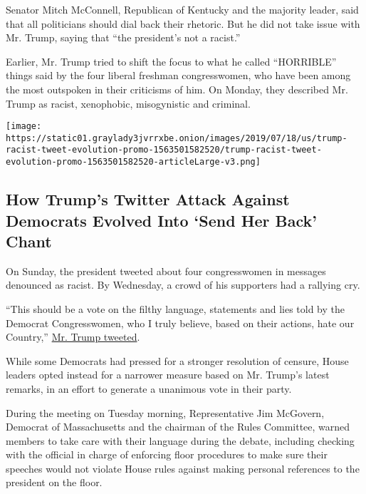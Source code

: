 Senator Mitch McConnell, Republican of Kentucky and the majority leader,
said that all politicians should dial back their rhetoric. But he did
not take issue with Mr. Trump, saying that ``the president's not a
racist.''

Earlier, Mr. Trump tried to shift the focus to what he called
``HORRIBLE'' things said by the four liberal freshman congresswomen, who
have been among the most outspoken in their criticisms of him. On
Monday, they described Mr. Trump as racist, xenophobic, misogynistic and
criminal.

\href{https://www.nytimes3xbfgragh.onion/interactive/2019/07/18/us/politics/trump-racist-tweet-evolution.html}{}

\texttt{[image: https://static01.graylady3jvrrxbe.onion/images/2019/07/18/us/trump-racist-tweet-evolution-promo-1563501582520/trump-racist-tweet-evolution-promo-1563501582520-articleLarge-v3.png]}

\hypertarget{how-trumps-twitter-attack-against-democrats-evolved-into-send-her-back-chant}{%
\subsection{How Trump's Twitter Attack Against Democrats Evolved Into
`Send Her Back'
Chant}\label{how-trumps-twitter-attack-against-democrats-evolved-into-send-her-back-chant}}

On Sunday, the president tweeted about four congresswomen in messages
denounced as racist. By Wednesday, a crowd of his supporters had a
rallying cry.

``This should be a vote on the filthy language, statements and lies told
by the Democrat Congresswomen, who I truly believe, based on their
actions, hate our Country,''
\href{https://twitter.com/realDonaldTrump/status/1151129281919102976}{Mr.
Trump tweeted}.

While some Democrats had pressed for a stronger resolution of censure,
House leaders opted instead for a narrower measure based on Mr. Trump's
latest remarks, in an effort to generate a unanimous vote in their
party.

During the meeting on Tuesday morning, Representative Jim McGovern,
Democrat of Massachusetts and the chairman of the Rules Committee,
warned members to take care with their language during the debate,
including checking with the official in charge of enforcing floor
procedures to make sure their speeches would not violate House rules
against making personal references to the president on the floor.

